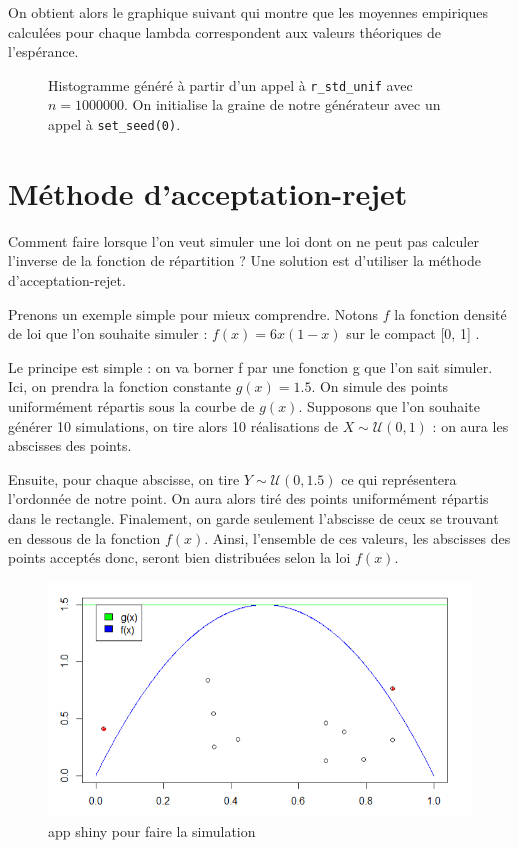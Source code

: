 \documentclass[10pt]{article} %
\begin{document}
On obtient alors le graphique suivant qui montre que les moyennes empiriques calculées pour chaque lambda correspondent aux valeurs théoriques de l'espérance.
\begin{figure}[h!]
    \centering
    
    \vspace{-1cm}
   \caption{Histogramme généré à partir d'un appel à \texttt{r\_std\_unif} avec $n = 1000000$. On initialise la graine de notre
    générateur avec un appel à \texttt{set\_seed(0)}.}

\end{figure}






\section{Méthode d'acceptation-rejet}

Comment faire lorsque l'on veut simuler une loi dont on ne peut pas calculer l'inverse de la fonction de répartition ? Une solution est d'utiliser la méthode d'acceptation-rejet.

Prenons un exemple simple pour mieux comprendre. Notons $f$ la fonction densité de loi que l'on souhaite simuler : $f(x) = 6x(1-x) $ sur le compact [0, 1] .

Le principe est simple : on va borner f par une fonction g que l'on sait simuler. Ici, on prendra la fonction constante $g(x) = 1.5 $. On simule des points uniformément répartis sous la courbe de $g(x)$. Supposons que l'on souhaite générer 10 simulations, on tire alors 10 réalisations de $X \sim \mathcal{U}(0, 1)$ : on aura les abscisses des points.

Ensuite, pour chaque abscisse, on tire $Y \sim \mathcal{U}(0, 1.5)$ ce qui représentera l'ordonnée de notre point. On aura alors tiré des points uniformément répartis dans le rectangle. Finalement, on garde seulement l'abscisse de ceux se trouvant en dessous de la fonction $f(x)$. Ainsi, l'ensemble de ces valeurs, les abscisses des points acceptés donc, seront bien distribuées selon la loi $f(x)$.

\newpage
\begin{figure}[h!]
\centering
\includegraphics[width=\linewidth]{media/graph_acceptation_rejet.png}

\caption{app shiny pour faire la simulation}
\end{figure}
\end{document}
